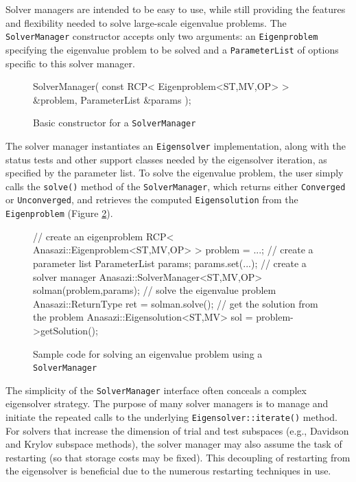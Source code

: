\documentclass[acmtoms,acmnow]{acmtrans2m}
\newcommand{\aspace}[1]{\texttt{#1}}
\begin{document}
Solver managers are intended to be easy to use, while still providing the
features and flexibility needed to solve large-scale eigenvalue problems.
The \aspace{SolverManager} constructor accepts only two arguments:
an \aspace{Eigenproblem} specifying the eigenvalue problem to be solved and a
\texttt{ParameterList} of options specific to this solver manager. 
\begin{figure}[htb]
\begin{center}
\begin{boxedverbatim}
SolverManager(
   const RCP< Eigenproblem<ST,MV,OP> > &problem,
   ParameterList                       &params
 );
\end{boxedverbatim}
\end{center}
\caption{Basic constructor for a \aspace{SolverManager}}
\label{fig:constructor2}
\end{figure}
The solver manager instantiates an \aspace{Eigensolver} implementation, along with the
status tests and other support classes needed by the eigensolver iteration, as
specified by the parameter list. To solve the eigenvalue
problem, the user simply calls the \verb!solve()! method of the \aspace{SolverManager},
which returns either \aspace{Converged} or \aspace{Unconverged}, and retrieves the computed
\aspace{Eigensolution} from the \aspace{Eigenproblem} (Figure \ref{fig:examplesolve}).

\begin{figure}[htb]
\begin{center}
\begin{boxedverbatim}
// create an eigenproblem
RCP< Anasazi::Eigenproblem<ST,MV,OP> > problem = ...;
// create a parameter list
ParameterList params;
params.set(...);
// create a solver manager
Anasazi::SolverManager<ST,MV,OP> solman(problem,params);
// solve the eigenvalue problem
Anasazi::ReturnType ret = solman.solve();
// get the solution from the problem
Anasazi::Eigensolution<ST,MV> sol = problem->getSolution();
\end{boxedverbatim}
\end{center}
\caption{Sample code for solving an eigenvalue problem using a \aspace{SolverManager}}
\label{fig:examplesolve}
\end{figure}

The simplicity of the \aspace{SolverManager} interface often conceals a complex eigensolver strategy.
The purpose of many solver managers is to manage and initiate the repeated calls to the underlying 
\aspace{Eigensolver::iterate()} method. For
solvers that increase the dimension of trial and test subspaces (e.g., Davidson and Krylov
subspace methods), the solver manager may also assume the task of restarting (so that
storage costs may be fixed). This decoupling of restarting from the eigensolver is
beneficial due to the numerous restarting techniques in use.
\end{document}
